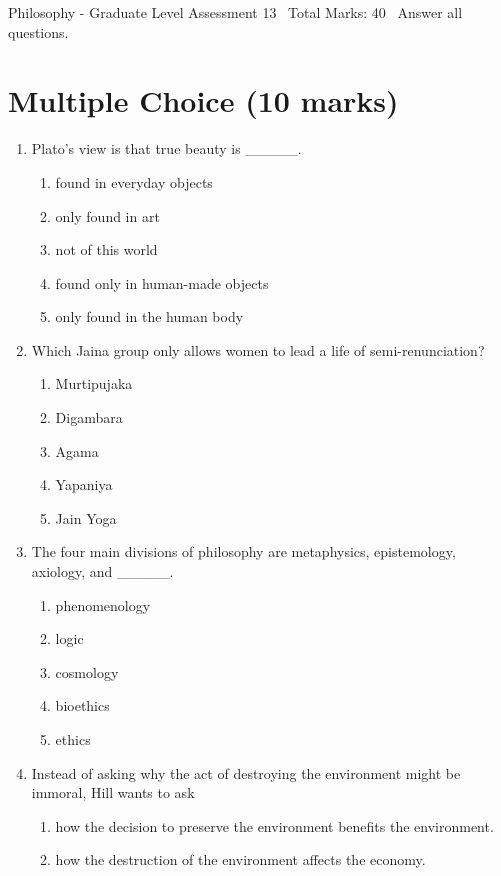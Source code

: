 \documentclass[12pt]{article}
\begin{document}
\begin{center}
Philosophy - Graduate Level Assessment 13 \
Total Marks: 40 \
Answer all questions.
\end{center}

\section*{Multiple Choice (10 marks)}
\begin{enumerate}[label=\arabic*.]
\item Plato's view is that true beauty is \_\_\_\_\_.
\begin{enumerate}[label=(\alph*)]
    \item found in everyday objects
    \item only found in art
    \item not of this world
    \item found only in human-made objects
    \item only found in the human body
\end{enumerate}
\item Which Jaina group only allows women to lead a life of semi-renunciation?
\begin{enumerate}[label=(\alph*)]
    \item Murtipujaka
    \item Digambara
    \item Agama
    \item Yapaniya
    \item Jain Yoga
\end{enumerate}
\item The four main divisions of philosophy are metaphysics, epistemology, axiology, and \_\_\_\_\_.
\begin{enumerate}[label=(\alph*)]
    \item phenomenology
    \item logic
    \item cosmology
    \item bioethics
    \item ethics
\end{enumerate}
\item Instead of asking why the act of destroying the environment might be immoral, Hill wants to ask
\begin{enumerate}[label=(\alph*)]
    \item how the decision to preserve the environment benefits the environment.
    \item how the destruction of the environment affects the economy.

\end{enumerate}
\end{enumerate}
\end{document}
